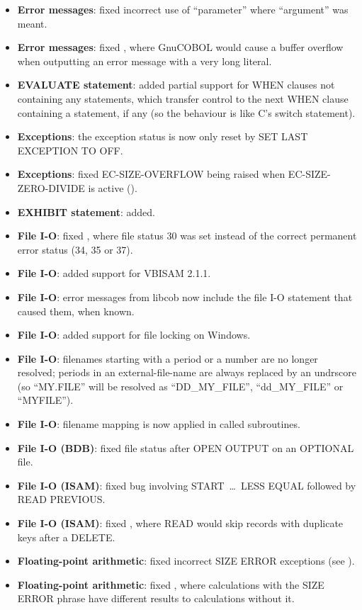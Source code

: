 \begin{itemize}
\item \textbf{Error messages}: fixed incorrect use of ``parameter'' where ``argument'' was meant.
\item \textbf{Error messages}: fixed , where GnuCOBOL would cause a buffer overflow when outputting an error message with a very long literal.
\item \textbf{EVALUATE statement}: added partial support for WHEN clauses not containing any statements, which transfer control to the next WHEN clause containing a statement, if any (so the behaviour is like C's switch statement).
\item \textbf{Exceptions}: the exception status is now only reset by SET LAST EXCEPTION TO OFF.
\item \textbf{Exceptions}: fixed EC-SIZE-OVERFLOW being raised when EC-SIZE-ZERO-DIVIDE is active ().
\item \textbf{EXHIBIT statement}: added.
\item \textbf{File I-O}: fixed , where file status 30 was set instead of the correct permanent error status (34, 35 or 37).
\item \textbf{File I-O}: added support for VBISAM 2.1.1.
\item \textbf{File I-O}: error messages from libcob now include the file I-O statement that caused them, when known.
\item \textbf{File I-O}: added support for file locking on Windows.
\item \textbf{File I-O}: filenames starting with a period or a number are no longer resolved; periods in an external-file-name are always replaced by an undrscore (so ``MY.FILE'' will be resolved as ``DD\_MY\_FILE'', ``dd\_MY\_FILE'' or ``MYFILE'').
\item \textbf{File I-O}: filename mapping is now applied in called subroutines.
\item \textbf{File I-O (BDB)}: fixed file status after OPEN OUTPUT on an OPTIONAL file.
\item \textbf{File I-O (ISAM)}: fixed bug involving START\ \ldots\ LESS EQUAL followed by READ PREVIOUS.
\item \textbf{File I-O (ISAM)}: fixed , where READ would skip records with duplicate keys after a DELETE.
\item \textbf{Floating-point arithmetic}: fixed incorrect SIZE ERROR exceptions (see ).
\item \textbf{Floating-point arithmetic}: fixed , where calculations with the SIZE ERROR phrase have different results to calculations without it.

\end{itemize}
